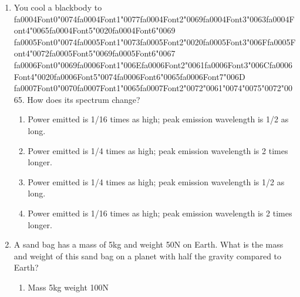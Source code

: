 \documentclass[12pt]{article}
\begin{document}
\begin{enumerate}[label=\arabic*.]
\begin{enumerate}[label=(\alph*)]
    \item 2:3 periodic ratio of Neptune:Pluto
    \item Kirkwood Gaps.
    \item Gaps in Saturn's rings.
    \item Breaking of small Jovian moons to form ring materials.
\end{enumerate}
\item You cool a blackbody to {\csname fa0004Font0\endcsname\char"0074}{\csname fa0004Font1\endcsname\char"0077}{\csname fa0004Font2\endcsname\char"0069}{\csname fa0004Font3\endcsname\char"0063}{\csname fa0004Font4\endcsname\char"0065}{\csname fa0004Font5\endcsname\char"0020}{\csname fa0004Font6\endcsname\char"0069} {\csname fa0005Font0\endcsname\char"0074}{\csname fa0005Font1\endcsname\char"0073}{\csname fa0005Font2\endcsname\char"0020}{\csname fa0005Font3\endcsname\char"006F}{\csname fa0005Font4\endcsname\char"0072}{\csname fa0005Font5\endcsname\char"0069}{\csname fa0005Font6\endcsname\char"0067} {\csname fa0006Font0\endcsname\char"0069}{\csname fa0006Font1\endcsname\char"006E}{\csname fa0006Font2\endcsname\char"0061}{\csname fa0006Font3\endcsname\char"006C}{\csname fa0006Font4\endcsname\char"0020}{\csname fa0006Font5\endcsname\char"0074}{\csname fa0006Font6\endcsname\char"0065}{\csname fa0006Font7\endcsname\char"006D} {\csname fa0007Font0\endcsname\char"0070}{\csname fa0007Font1\endcsname\char"0065}{\csname fa0007Font2\endcsname\char"0072}{\char"0061}{\char"0074}{\char"0075}{\char"0072}{\char"0065}. How does its spectrum change?
\begin{enumerate}[label=(\alph*)]
    \item Power emitted is 1/16 times as high; peak emission wavelength is 1/2 as long.
    \item Power emitted is 1/4 times as high; peak emission wavelength is 2 times longer.
    \item Power emitted is 1/4 times as high; peak emission wavelength is 1/2 as long.
    \item Power emitted is 1/16 times as high; peak emission wavelength is 2 times longer.
\end{enumerate}
\item A sand bag has a mass of 5kg and weight 50N on Earth. What is the mass and weight of this
sand bag on a planet with half the gravity compared to Earth?
\begin{enumerate}[label=(\alph*)]
    \item Mass 5kg weight 100N

\end{enumerate}
\end{enumerate}
\end{document}
